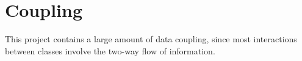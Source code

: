 \documentclass[letterpaper, twoside]{report}
\begin{document}
\chapter{Coupling}
This project contains a large amount of data coupling, since most interactions between classes involve the two-way flow of information. 
\end{document}
